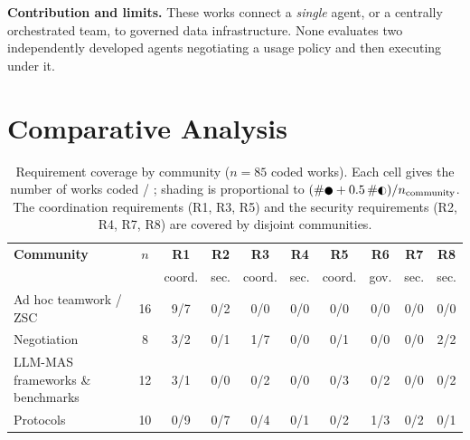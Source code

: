 \documentclass[conference]{IEEEtran}
\newcommand{\full}{{\small\CIRCLE}}
\newcommand{\half}{{\small\LEFTcircle}}
\begin{document}
\textbf{Contribution and limits.} These works connect a \emph{single} agent, or a centrally orchestrated team, to governed data infrastructure. None evaluates two independently developed agents negotiating a usage policy and then executing under it.

\section{Comparative Analysis}\label{sec-7}

\begin{table}[t]
\centering
\footnotesize
\setlength{\tabcolsep}{4pt}
\caption{Requirement coverage by community ($n=85$ coded works). Each cell gives the number of works coded \full{} / \half{}; shading is proportional to $(\#\full + 0.5\,\#\half)/n_{\text{community}}$. The coordination requirements (R1, R3, R5) and the security requirements (R2, R4, R7, R8) are covered by disjoint communities.}
\label{tab-2}
\begin{tabular}{l c cccccccc}
\toprule
\textbf{Community} & $n$ & \textbf{R1} & \textbf{R2} & \textbf{R3} & \textbf{R4} & \textbf{R5} & \textbf{R6} & \textbf{R7} & \textbf{R8} \\
& & \scriptsize coord. & \scriptsize sec. & \scriptsize coord. & \scriptsize sec. & \scriptsize coord. & \scriptsize gov. & \scriptsize sec. & \scriptsize sec. \\
\midrule
Ad hoc teamwork / ZSC & 16 & \cellcolor{cellblue!55}9/7 & \cellcolor{cellblue!4}0/2 & \cellcolor{cellblue!0}0/0 & \cellcolor{cellblue!0}0/0 & \cellcolor{cellblue!0}0/0 & \cellcolor{cellblue!0}0/0 & \cellcolor{cellblue!0}0/0 & \cellcolor{cellblue!0}0/0 \\
Negotiation & 8 & \cellcolor{cellblue!35}3/2 & \cellcolor{cellblue!4}0/1 & \cellcolor{cellblue!39}1/7 & \cellcolor{cellblue!0}0/0 & \cellcolor{cellblue!4}0/1 & \cellcolor{cellblue!0}0/0 & \cellcolor{cellblue!0}0/0 & \cellcolor{cellblue!26}2/2 \\
LLM-MAS frameworks \& benchmarks & 12 & \cellcolor{cellblue!20}3/1 & \cellcolor{cellblue!0}0/0 & \cellcolor{cellblue!6}0/2 & \cellcolor{cellblue!0}0/0 & \cellcolor{cellblue!9}0/3 & \cellcolor{cellblue!6}0/2 & \cellcolor{cellblue!0}0/0 & \cellcolor{cellblue!6}0/2 \\
Protocols & 10 & \cellcolor{cellblue!32}0/9 & \cellcolor{cellblue!24}0/7 & \cellcolor{cellblue!14}0/4 & \cellcolor{cellblue!4}0/1 & \cellcolor{cellblue!7}0/2 & \cellcolor{cellblue!18}1/3 & \cellcolor{cellblue!7}0/2 & \cellcolor{cellblue!4}0/1 \\

\end{tabular}
\end{table}
\end{document}
